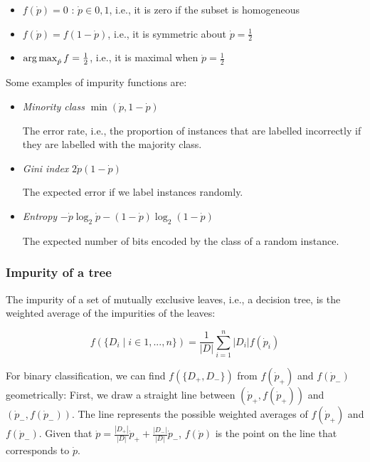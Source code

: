 \begin{itemize}
  \item $f(\dot{p}) = 0$ : $\dot{p} \in {0, 1}$, i.e., it is zero if the subset is homogeneous
  \item $f(\dot{p}) = f(1 - \dot{p})$, i.e., it is symmetric about $\dot{p} = \frac{1}{2}$
  \item $\operatorname*{arg\,max}_{\dot{p}} f = \frac{1}{2}$, i.e., it is maximal when $\dot{p} = \frac{1}{2}$
\end{itemize}
Some examples of impurity functions are:

\begin{itemize}
  \item \textit{Minority class} $\min(\dot{p}, 1 - \dot{p})$

        The error rate, i.e., the proportion of instances that are labelled incorrectly
        if they are labelled with the majority class.

  \item \textit{Gini index} $2 \dot{p} (1 - \dot{p})$

        The expected error if we label instances randomly.

  \item \textit{Entropy} $- \dot{p} \log_2 \dot{p} - (1 - \dot{p}) \log_2 (1 - \dot{p})$

        The expected number of bits encoded by the class of a random instance.

\end{itemize}

\subsubsection{Impurity of a tree}

The impurity of a set of mutually exclusive leaves, i.e., a decision tree, is the weighted average of the impurities of the leaves:

\begin{equation}
  \label{eqnImpurityTree}
  f(\{ D_i \mid i \in 1, ..., n \}) = \frac{1}{|D|} \sum_{i = 1}^n |D_i| f(\dot{p}_i)
\end{equation}

For binary classification, we can find $f(\{ D_+, D_- \})$ from $f(\dot{p}_+)$
and $f(\dot{p}_-)$ geometrically: First, we draw a straight line between
$(\dot{p}_+, f(\dot{p}_+))$ and $(\dot{p}_-, f(\dot{p}_-))$.
The line represents the possible weighted averages of $f(\dot{p}_+)$ and
$f(\dot{p}_-)$.
Given that $\dot{p} = \frac{|D_+|}{|D|} \dot{p}_+ + \frac{|D_-|}{|D|}
  \dot{p}_-$, $f(\dot{p})$ is the point on the line that corresponds to
$\dot{p}$.

